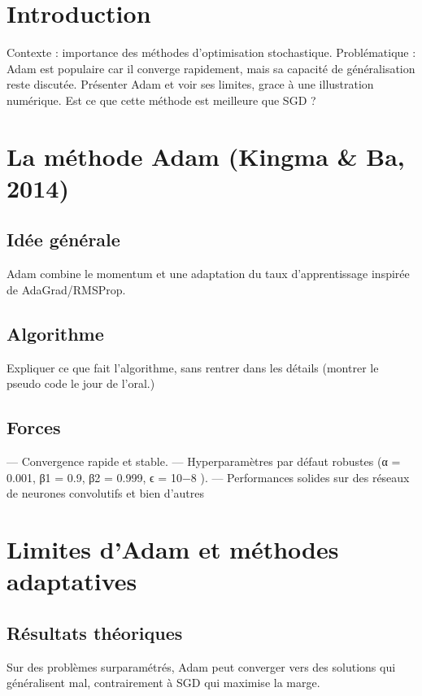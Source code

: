 \documentclass[a4paper,12pt]{article}
\begin{document}
\thispagestyle{empty}

\newpage

\tableofcontents 

\newpage

\section{Introduction}

Contexte : importance des méthodes d’optimisation stochastique. Problématique : Adam est
populaire car il converge rapidement, mais sa capacité de généralisation reste discutée. Présenter
Adam et voir ses limites, grace à une illustration numérique. Est ce que cette méthode est
meilleure que SGD ?

\section{La méthode Adam (Kingma & Ba, 2014)}
\subsection{Idée générale}

Adam combine le momentum et une adaptation du taux d’apprentissage inspirée de AdaGrad/RMSProp.
\subsection{Algorithme}

Expliquer ce que fait l’algorithme, sans rentrer dans les détails (montrer le pseudo code le
jour de l’oral.)

\subsection{Forces}
— Convergence rapide et stable.
— Hyperparamètres par défaut robustes (α = 0.001, β1 = 0.9, β2 = 0.999, ϵ = 10−8
).
— Performances solides sur des réseaux de neurones convolutifs et bien d’autres

\section{Limites d’Adam et méthodes adaptatives}

\subsection{Résultats théoriques}

Sur des problèmes surparamétrés, Adam peut converger vers des solutions qui généralisent
mal, contrairement à SGD qui maximise la marge.
\end{document}
